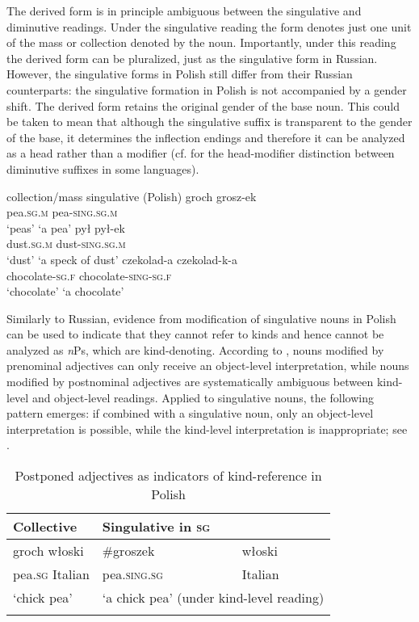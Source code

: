 \documentclass[output=paper,colorlinks,citecolor=brown]{langscibook}
\begin{document}
The derived form is in principle ambiguous between the singulative and di\-min\-u\-tive readings. Under the singulative reading the form denotes just one unit of the mass or collection denoted by the noun. Importantly, under this reading the derived form can be pluralized, just as the singulative form in Russian. However, the singulative forms in Polish still differ from their Russian counterparts: the singulative formation in Polish is not accompanied by a gender shift. The derived form retains the original gender of the base noun. This could be taken to mean that although the singulative suffix is transparent to the gender of the base, it determines the inflection endings and therefore it can be analyzed as a head rather than a modifier (cf. \citealt{WiltschkoSteriopolo2008} for the head-modifier distinction between diminutive suffixes in some languages). 

\ea\label{ex:geist:30}
\hspace{.5cm} collection/mass \phantom{i} singulative \hfill (Polish)
\ea 
\gll groch \phantom{XXXXi} grosz-ek \\
pea.\textsc{sg.m} {} pea-\textsc{sing.sg.m} \\
 \glt `peas' \phantom{XXXXXXi} `a pea'\label{ex:geist:30a}
\ex
\gll pył \phantom{XXXX} pył-ek \\
dust.\textsc{sg.m} {} dust-\textsc{sing.sg.m}  \\
\glt `dust' \phantom{XXXXXXi} `a speck of dust'\label{ex:geist:30b}
\ex
\gll czekolad-a \phantom{X} czekolad-k-a \\
       chocolate-\textsc{\textsc{sg.f}} {} chocolate-\textsc{sing-\textsc{sg.f}} \\
 \glt `chocolate' \phantom{XXXi} `a chocolate'\label{ex:geist:30c}
\z\z 

\noindent Similarly to Russian, evidence from modification of singulative nouns in Polish can be used to indicate that they cannot refer to kinds and hence cannot be analyzed as \textit{n}Ps, which are kind-denoting. According to \citet{Wagiel2014}, nouns modified by prenominal adjectives can only receive an object-level interpretation, while nouns modified by postnominal adjectives are systematically ambiguous between kind-level and object-level readings. Applied to singulative nouns, the following pattern emerges: if combined with a singulative noun, only an object-level interpretation is possible, while the kind-level interpretation is inappropriate; see .  

\begin{table}
\centering
\begin{tabular}{lll} 
\lsptoprule
Collective & \multicolumn{2}{l}{Singulative in \textsc{sg}} \\
\midrule
groch włoski & \#groszek & włoski \\ 
pea.\textsc{sg} Italian & \phantom{\#}pea.\textsc{sing.sg} & Italian \\ 
`chick pea' & \multicolumn{2}{l}{`a chick pea' (under kind-level reading)} \\ 
\lspbottomrule
\end{tabular}
\caption{Postponed adjectives as indicators of kind-reference in Polish}
\label{tab:postponed_Pol}
\end{table}
\end{document}
